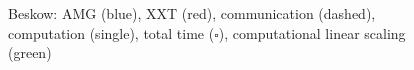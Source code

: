 \documentclass{sig-alternate}
\begin{document}
\begin{figure}
{  }
\caption{Beskow: AMG ({\color{blue}blue}), XXT ({\color{red}red}), communication (dashed),
  computation (single),  total time ($\square$), computational linear scaling
  ({\color{green}green})}
\label{fig:scaling_beskow}
\end{figure}
\end{document}
